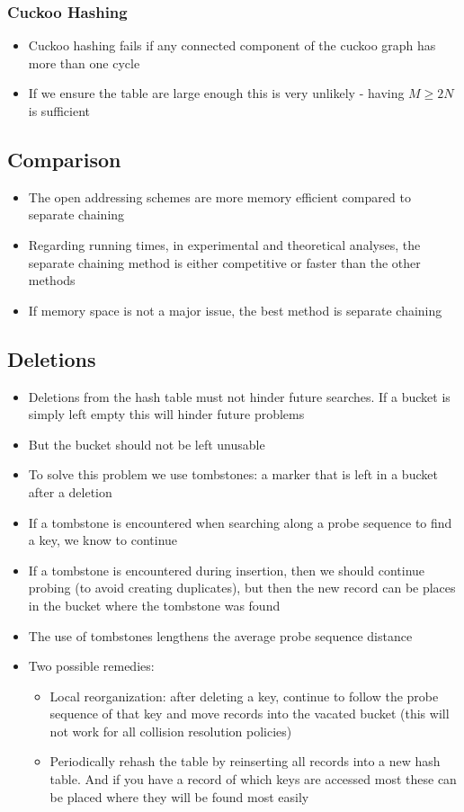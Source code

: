 \documentclass{article}[18pt]
\begin{document}
\subsubsection{Cuckoo Hashing}
\begin{itemize}
	\item Cuckoo hashing fails if any connected component of the cuckoo graph has more than one cycle
	\item If we ensure the table are large enough this is very unlikely - having $M\geqslant 2N$ is sufficient
\end{itemize}
\subsection{Comparison}
\begin{itemize}
	\item The open addressing schemes are more memory efficient compared to separate chaining
	\item Regarding running times, in experimental and theoretical analyses, the separate chaining method is either competitive or faster than the other methods
	\item If memory space is not a major issue, the best method is separate chaining
\end{itemize}
\subsection{Deletions}
\begin{itemize}
	\item Deletions from the hash table must not hinder future searches. If a bucket is simply left empty this will hinder future problems
	\item But the bucket should not be left unusable
	\item To solve this problem we use tombstones: a marker that is left in a bucket after a deletion
	\item If a tombstone is encountered when searching along a probe sequence to find a key, we know to continue
	\item If a tombstone is encountered during insertion, then we should continue probing (to avoid creating duplicates), but then the new record can be places in the bucket where the tombstone was found
	\item The use of tombstones lengthens the average probe sequence distance
	\item Two possible remedies:
	\begin{itemize}
		\item Local reorganization: after deleting a key, continue to follow the probe sequence of that key and move records into the vacated bucket (this will not work for all collision resolution policies)
		\item Periodically rehash the table by reinserting all records into a new hash table. And if you have a record of which keys are accessed most these can be placed where they will be found most easily
	\end{itemize}
\end{itemize}
\end{document}

